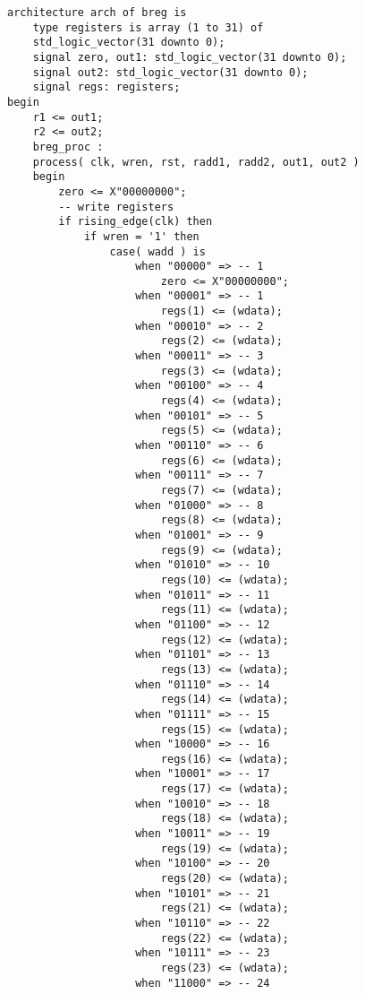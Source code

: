 \documentclass[a4paper]{article}
\begin{document}
\begin{lstlisting}
architecture arch of breg is
    type registers is array (1 to 31) of 
    std_logic_vector(31 downto 0);
    signal zero, out1: std_logic_vector(31 downto 0);
    signal out2: std_logic_vector(31 downto 0);
    signal regs: registers;
begin
    r1 <= out1;
    r2 <= out2;
    breg_proc :
    process( clk, wren, rst, radd1, radd2, out1, out2 )
    begin
        zero <= X"00000000";
        -- write registers
        if rising_edge(clk) then
            if wren = '1' then
                case( wadd ) is
                    when "00000" => -- 1
                        zero <= X"00000000";
                    when "00001" => -- 1
                        regs(1) <= (wdata);
                    when "00010" => -- 2
                        regs(2) <= (wdata);
                    when "00011" => -- 3
                        regs(3) <= (wdata);
                    when "00100" => -- 4
                        regs(4) <= (wdata);
                    when "00101" => -- 5
                        regs(5) <= (wdata);
                    when "00110" => -- 6
                        regs(6) <= (wdata);
                    when "00111" => -- 7
                        regs(7) <= (wdata);
                    when "01000" => -- 8
                        regs(8) <= (wdata);
                    when "01001" => -- 9
                        regs(9) <= (wdata);
                    when "01010" => -- 10
                        regs(10) <= (wdata);
                    when "01011" => -- 11
                        regs(11) <= (wdata);
                    when "01100" => -- 12
                        regs(12) <= (wdata);
                    when "01101" => -- 13
                        regs(13) <= (wdata);
                    when "01110" => -- 14
                        regs(14) <= (wdata);
                    when "01111" => -- 15
                        regs(15) <= (wdata);
                    when "10000" => -- 16
                        regs(16) <= (wdata);
                    when "10001" => -- 17
                        regs(17) <= (wdata);
                    when "10010" => -- 18
                        regs(18) <= (wdata);
                    when "10011" => -- 19
                        regs(19) <= (wdata);
                    when "10100" => -- 20
                        regs(20) <= (wdata);
                    when "10101" => -- 21
                        regs(21) <= (wdata);
                    when "10110" => -- 22
                        regs(22) <= (wdata);
                    when "10111" => -- 23
                        regs(23) <= (wdata);
                    when "11000" => -- 24

\end{lstlisting}
\end{document}
